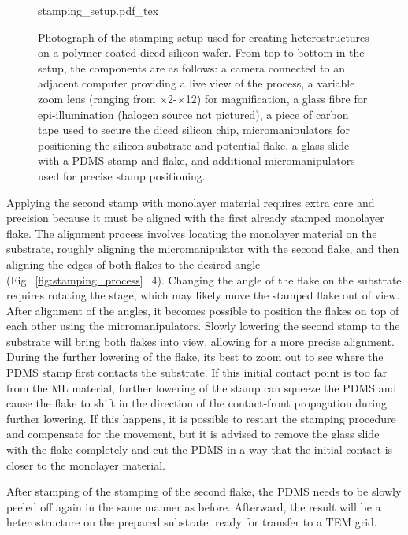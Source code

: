 \begin{figure}[h]
	\centering
	\def\svgwidth{0.65\linewidth}
	{stamping_setup.pdf_tex}
    \caption{Photograph of the stamping setup used for creating heterostructures on a polymer-coated diced silicon wafer. 
    From top to bottom in the setup, the components are as follows: a camera connected to an adjacent computer providing a live view of the process, a variable zoom lens (ranging from $\times$2\--$\times$12) for magnification, a glass fibre for epi-illumination (halogen source not pictured), a piece of carbon tape used to secure the diced silicon chip, micromanipulators for positioning the silicon substrate and potential flake, a glass slide with a PDMS stamp and flake, and additional micromanipulators used for precise stamp positioning.}
	\label{fig:stamping_set-up}
\end{figure}

Applying the second stamp with monolayer material requires extra care and precision because  it must be aligned with the first already stamped monolayer flake. 
%
The alignment process involves locating the monolayer material on the substrate, roughly aligning the micromanipulator with the second flake, and then aligning the edges of both flakes to the desired angle (Fig.~\ref{fig:stamping_process}~.4).
%
Changing the angle of the flake on the substrate requires rotating the stage, which may likely move the stamped flake out of view. 
%
After alignment of the angles, it becomes possible to position the flakes on top of each other using the micromanipulators. 
%
Slowly lowering the second stamp to the substrate will bring both flakes into view, allowing for a more precise alignment.
%
During the further lowering of the flake, its best to zoom out to see where the PDMS stamp first contacts the substrate. 
%
If this initial contact point is too far from the ML material, further lowering of the stamp can squeeze the PDMS and cause the flake to shift in the direction of the contact-front propagation during further lowering.
%
If this happens, it is possible to restart the stamping procedure and compensate for the movement, but it is advised to remove the glass slide with the flake completely and cut the PDMS in a way that the initial contact is closer to the monolayer material.

After stamping of the stamping of the second flake, the PDMS needs to be slowly peeled off again in the same manner as before.
%
Afterward, the result will be a heterostructure on the prepared substrate, ready for transfer to a TEM grid.

